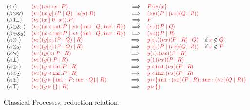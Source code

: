 \documentclass[draft,submission,copyright,creativecommons]{eptcs}
\begin{document}
\begin{figure}
 \[
    \begin{array}{llcll}
      \cpRedAxCut1
      & \tm{\cpCut{x}{\cpLink{w}{x}}{P}}
      & \Longrightarrow
      & \tm{\cpSub{w}{x}{P}} 
      \\
      \cpRedBetaTensParr
      & \tm{\cpCut{x}{\cpSend{x}{y}{P}{Q}}{\cpRecv{x}{y}{R}}}
      & \Longrightarrow
      & \tm{\cpCut{y}{P}{\cpCut{x}{Q}{R}}}
      \\
      \cpRedBetaOneBot
      & \tm{\cpCut{x}{\cpHalt{x}}{\cpWait{x}{P}}}
      & \Longrightarrow
      & \tm{P}
      \\
      \cpRedBetaPlusWith1
      & \tm{\cpCut{x}{\cpInl{x}{P}}{\cpCase{x}{Q}{R}}}
      & \Longrightarrow
      & \tm{\cpCut{x}{P}{Q}}
      \\
      \cpRedBetaPlusWith2
      & \tm{\cpCut{x}{\cpInr{x}{P}}{\cpCase{x}{Q}{R}}}
      & \Longrightarrow
      & \tm{\cpCut{x}{P}{R}}
      \\
      \cpRedKappaTens1
      & \tm{\cpCut{x}{\cpSend{y}{z}{P}{Q}}{R}}
      & \Longrightarrow \;
      & \tm{\cpSend{y}{z}{\cpCut{x}{P}{R}}{Q}}
        \quad \text{if} \; \notFreeIn{x}{Q}
      \\
      \cpRedKappaTens2
      & \tm{\cpCut{x}{\cpSend{y}{z}{P}{Q}}{R}}
      & \Longrightarrow \;
      & \tm{\cpSend{y}{z}{P}{\cpCut{x}{Q}{R}}}
        \quad \text{if} \; \notFreeIn{x}{P}
      \\
      \cpRedKappaParr
      & \tm{\cpCut{x}{\cpRecv{y}{z}{P}}{R}}
      & \Longrightarrow \;
      & \tm{\cpRecv{y}{z}{\cpCut{x}{P}{R}}}
      \\
      \cpRedKappaBot
      & \tm{\cpCut{x}{\cpWait{y}{P}}{R}}
      & \Longrightarrow \;
      & \tm{\cpWait{y}{\cpCut{x}{P}{R}}}
      \\
      \cpRedKappaPlus1
      & \tm{\cpCut{x}{\cpInl{y}{P}}{R}}
      & \Longrightarrow \;
      & \tm{\cpInl{y}{\cpCut{x}{P}{R}}}
      \\
      \cpRedKappaPlus2
      &\tm{\cpCut{x}{\cpInr{y}{P}}{R}}
      & \Longrightarrow \;
      & \tm{\cpInr{y}{\cpCut{x}{P}{R}}}
      \\
      \cpRedKappaWith
      & \tm{\cpCut{x}{\cpCase{y}{P}{Q}}{R}}
      & \Longrightarrow \;
      & \tm{\cpCase{y}{\cpCut{x}{P}{R}}{\cpCut{x}{Q}{R}}}
      \\
      \cpRedKappaTop
      & \tm{\cpCut{x}{\cpAbsurd{y}}{R}}
      & \Longrightarrow \;
      & \tm{\cpAbsurd{y}}
    \end{array}
  \]
  \begin{center}
    \begin{prooftree*}
      \SYM{\cpRedGammaCut}
    \end{prooftree*}
    \begin{prooftree*}
      \SYM{\cpRedGammaEquiv}
    \end{prooftree*}
  \end{center}
  \caption{Classical Processes, reduction relation.}
  \label{fig:cp-reduction}
\end{figure}
\end{document}
